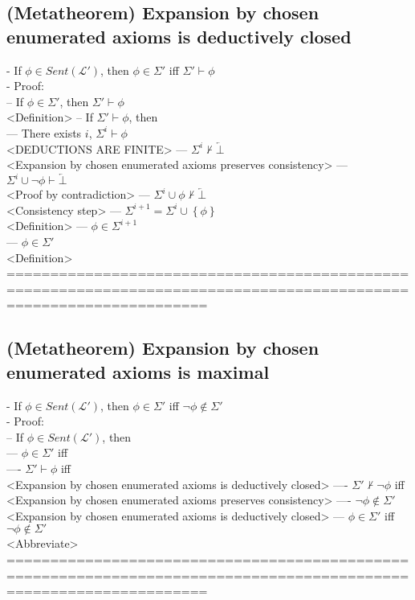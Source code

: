 \documentclass{book}
\newcommand{\inot}{\not}
\newcommand{\contr}{\overleftarrow{\bot}}
\newcommand{\set}[1]{\left\{ #1 \right\}}
\begin{document}
\subsection{(Metatheorem) Expansion by chosen enumerated axioms is deductively closed} %
	- If $\phi \in Sent(\mathcal{L}')$, then $\phi \in \Sigma'$ iff $\Sigma' \vdash \phi$ \\
	- Proof: \\
		-- If $\phi \in \Sigma'$, then $\Sigma' \vdash \phi$ \\ <Definition>
		-- If $\Sigma' \vdash \phi$, then \\
			--- There exists $i$, $\Sigma^i \vdash \phi$ \\ <DEDUCTIONS ARE FINITE>
			--- $\Sigma^i \inot \vdash \contr$ \\ <Expansion by chosen enumerated axioms preserves consistency>
			--- $\Sigma^i \cup {\lnot \phi} \vdash \contr$ \\ <Proof by contradiction>
			--- $\Sigma^i \cup {\phi} \inot \vdash \contr$ \\ <Consistency step>
			--- $\Sigma^{i+1} = \Sigma^i \cup \set{\phi}$ \\ <Definition>
			--- $\phi \in \Sigma^{i+1}$ \\
			--- $\phi \in \Sigma'$ \\ <Definition>
	===================================================================================================================
\subsection{(Metatheorem) Expansion by chosen enumerated axioms is maximal}
	- If $\phi \in Sent(\mathcal{L}')$, then $\phi \in \Sigma'$ iff $\lnot \phi \inot \in \Sigma'$ \\
	- Proof: \\
		-- If $\phi \in Sent(\mathcal{L}')$, then \\
			--- $\phi \in \Sigma'$ iff \\
				---- $\Sigma' \vdash \phi$ iff \\ <Expansion by chosen enumerated axioms is deductively closed>
				---- $\Sigma' \inot \vdash \lnot \phi$ iff \\ <Expansion by chosen enumerated axioms preserves consistency>
				---- $\lnot \phi \inot \in \Sigma'$ \\ <Expansion by chosen enumerated axioms is deductively closed>
			--- $\phi \in \Sigma'$ iff $\lnot \phi \inot \in \Sigma'$ \\ <Abbreviate>
	===================================================================================================================
\end{document}
